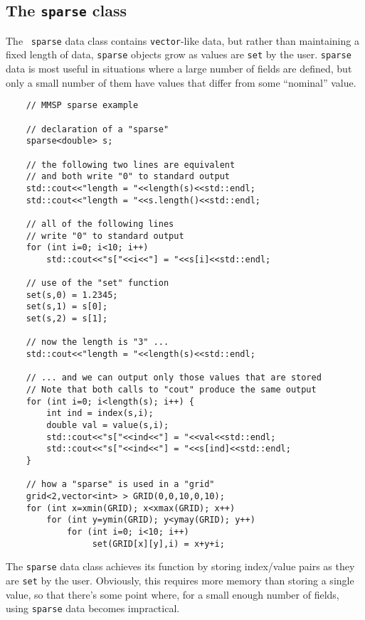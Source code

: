 \subsection{The {\tt sparse} class}
The \MMSP\ {\tt sparse} data class contains {\tt vector}-like data, but rather than maintaining a fixed length of data, {\tt sparse} objects grow as values are {\tt set} by the user.  {\tt sparse} data is most useful in situations where a large number of fields are defined, but only a small number of them have values that differ from some ``nominal'' value.
\begin{shadebox}
\begin{verbatim}
    // MMSP sparse example

    // declaration of a "sparse"
    sparse<double> s;

    // the following two lines are equivalent
    // and both write "0" to standard output
    std::cout<<"length = "<<length(s)<<std::endl;
    std::cout<<"length = "<<s.length()<<std::endl;

    // all of the following lines
    // write "0" to standard output
    for (int i=0; i<10; i++)
        std::cout<<"s["<<i<<"] = "<<s[i]<<std::endl;

    // use of the "set" function
    set(s,0) = 1.2345;
    set(s,1) = s[0];
    set(s,2) = s[1];

    // now the length is "3" ...
    std::cout<<"length = "<<length(s)<<std::endl;

    // ... and we can output only those values that are stored
    // Note that both calls to "cout" produce the same output
    for (int i=0; i<length(s); i++) {
        int ind = index(s,i);
        double val = value(s,i);
        std::cout<<"s["<<ind<<"] = "<<val<<std::endl;
        std::cout<<"s["<<ind<<"] = "<<s[ind]<<std::endl;
	}

    // how a "sparse" is used in a "grid"
    grid<2,vector<int> > GRID(0,0,10,0,10);
    for (int x=xmin(GRID); x<xmax(GRID); x++)
        for (int y=ymin(GRID); y<ymay(GRID); y++)
            for (int i=0; i<10; i++)
                 set(GRID[x][y],i) = x+y+i;
\end{verbatim}
\end{shadebox}
The {\tt sparse} data class achieves its function by storing index/value pairs as they are {\tt set} by the user.  Obviously, this requires more memory than storing a single value, so that there's some point where, for a small enough number of fields, using {\tt sparse} data becomes impractical.

